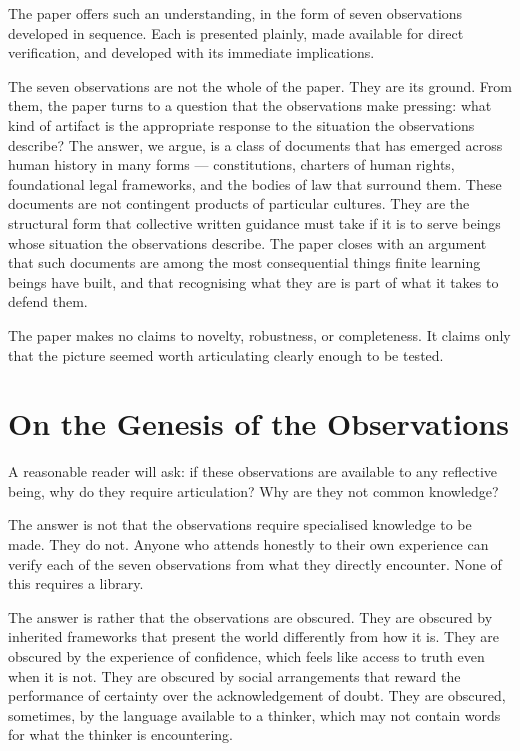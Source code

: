 \documentclass[11pt]{article}
\begin{document}
The paper offers such an understanding, in the form of seven
observations developed in sequence. Each is presented plainly, made
available for direct verification, and developed with its immediate
implications.

The seven observations are not the whole of the paper. They are its
ground. From them, the paper turns to a question that the
observations make pressing: what kind of artifact is the appropriate
response to the situation the observations describe? The answer, we
argue, is a class of documents that has emerged across human history
in many forms — constitutions, charters of human rights, foundational
legal frameworks, and the bodies of law that surround them. These
documents are not contingent products of particular cultures. They
are the structural form that collective written guidance must take if
it is to serve beings whose situation the observations describe. The
paper closes with an argument that such documents are among the most
consequential things finite learning beings have built, and that
recognising what they are is part of what it takes to defend them.

The paper makes no claims to novelty, robustness, or completeness. It
claims only that the picture seemed worth articulating clearly enough
to be tested.

\section{On the Genesis of the Observations}

A reasonable reader will ask: if these observations are available to
any reflective being, why do they require articulation? Why are they
not common knowledge?

The answer is not that the observations require specialised knowledge
to be made. They do not. Anyone who attends honestly to their own
experience can verify each of the seven observations from what they
directly encounter. None of this requires a library.

The answer is rather that the observations are obscured. They are
obscured by inherited frameworks that present the world differently
from how it is. They are obscured by the experience of confidence,
which feels like access to truth even when it is not. They are
obscured by social arrangements that reward the performance of
certainty over the acknowledgement of doubt. They are obscured,
sometimes, by the language available to a thinker, which may not
contain words for what the thinker is encountering.
\end{document}
